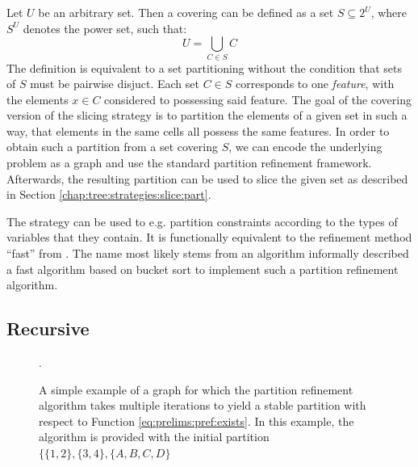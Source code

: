 			Let $U$ be an arbitrary set. Then a covering can be defined as a set $S \subseteq 2^U$, where $S^U$ denotes the power set, such that:
			\begin{equation*}
				U = \bigcup_{C \in S} C
			\end{equation*}
			The definition is equivalent to a set partitioning without the condition that sets of $S$ must be pairwise disjuct.
			Each set $C \in S$ corresponds to one \textit{feature}, with the elements $x \in C$ considered to possessing said feature.			
			The goal of the covering version of the slicing strategy is to partition the elements of a given set in such a way, that elements in the same cells all possess the same features.
			In order to obtain such a partition from a set covering $S$, we can encode the underlying problem as a graph and use the standard partition refinement framework.
			Afterwards, the resulting partition can be used to slice the given set as described in Section \ref{chap:tree:strategies:slice:part}.
			
			The strategy can be used to e.g. partition constraints according to the types of variables that they contain.
			It is functionally equivalent to the refinement method \enquote{fast} from \cite{salvagninDetectingSemanticGroups2016}.
			The name most likely stems from an algorithm informally described a fast algorithm based on bucket sort to implement such a partition refinement algorithm.
			
			\clearpage
		
		\subsection{Recursive}
		
			\begin{figure}[ht!]
				\centering
				
				\caption{A simple example of a graph for which the partition refinement algorithm takes multiple iterations to yield a stable partition with respect to Function \ref{eq:prelims:pref:exists}. In this example, the algorithm is provided with the initial partition $\{ \{ 1, 2 \}, \{ 3, 4 \}, \{ A, B, C, D \}$}.
				\label{fig:tree:strat:rec}
			\end{figure}

